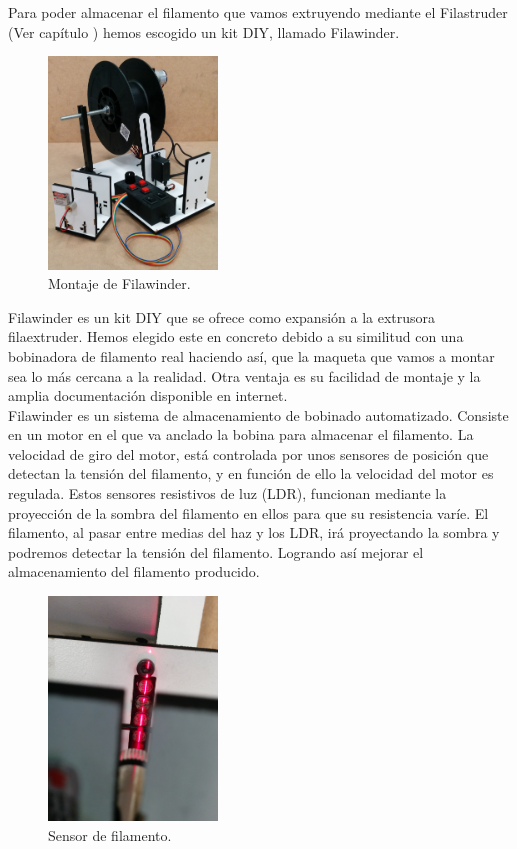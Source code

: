 Para poder almacenar el filamento que vamos extruyendo mediante el  Filastruder (Ver capítulo ) hemos escogido un kit DIY, llamado Filawinder\cite{filawinder}. 

    \begin{figure}[H]
            \centering
            \includegraphics[width=0.4\textwidth]{images/filawinder/IMG_20150313_103643.jpg}
            \caption{Montaje de Filawinder.}
            \label{fig:winder_winder}
    \end{figure}

Filawinder es un kit DIY que se ofrece como expansión a la extrusora  filaextruder. Hemos elegido este en concreto debido a su similitud con una bobinadora de filamento real haciendo así, que la maqueta que vamos a montar sea lo más cercana a la realidad. Otra ventaja es su facilidad de montaje y la amplia documentación disponible en internet.\\

Filawinder es un sistema de almacenamiento de bobinado automatizado. Consiste en un motor en el que va anclado la bobina para almacenar el filamento. La velocidad de giro del motor, está controlada por unos sensores de posición que detectan la tensión del filamento, y en función de ello la velocidad del motor es regulada. Estos sensores resistivos de luz (LDR), funcionan mediante la proyección de la sombra del filamento en ellos para que su resistencia varíe. El filamento, al pasar entre medias del haz y los LDR, irá proyectando la sombra y podremos detectar la tensión del filamento. Logrando así mejorar el almacenamiento del filamento producido.

    \begin{figure}[H]
            \centering
            \includegraphics[width=0.4\textwidth]{images/filawinder/Sensor-filamento.jpg}
            \caption{Sensor de filamento.}
            \label{fig:winder_sensor}
    \end{figure}

